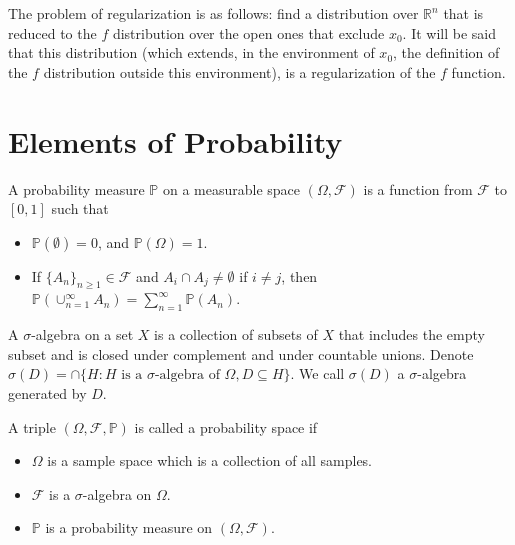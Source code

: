 	The problem of regularization is as follows: find a distribution over $\mathbb{R}^n$ that is reduced to the $f$ distribution over the open ones that exclude $x_0$. It will be said that this distribution (which extends, in the environment of $x_0$, the definition of the $f$ distribution outside this environment), is a regularization of the $f$ function.
	
\chapter{Elements of Probability}
\label{Appendix_B}
	\begin{definition}
		A probability measure $\mathbb{P}$ on a measurable space $(\Omega, \mathcal{F})$ is a function from $\mathcal{F}$ to $[0, 1]$ such that
			\begin{itemize}
				\item
				$\mathbb{P} (\emptyset) = 0$, and $\mathbb{P} (\Omega) = 1$.
				\item 
				If $\{ A_n \}_{n \geq 1} \in \mathcal{F}$ and $A_i \cap A_j \neq \emptyset$ if $i \neq j$, then $\mathbb{P} (\cup^{\infty}_{n=1} A_n) = \sum^{\infty}_{n = 1} \mathbb{P} (A_n)$.
			\end{itemize}	
	\end{definition}
	
	\noindent A $\sigma$-algebra on a set $X$ is a collection of subsets of $X$ that includes the empty subset and is closed under complement and under countable unions. Denote $\sigma (D) = \cap \{ H : H \text{ is a } \sigma \text{-algebra of } \Omega, D \subseteq H \}$. We call $\sigma (D)$ a $\sigma$-algebra generated by $D$.
	
	\begin{definition}
		A triple  $(\Omega, \mathcal{F}, \mathbb{P})$ is called a probability space if
		\begin{itemize}
			\item
			$\Omega$ is a sample space which is a collection of all samples.
			\item 
			$\mathcal{F}$ is a $\sigma$-algebra on $\Omega$.
			\item
			$\mathbb{P}$ is a probability measure on $(\Omega, \mathcal{F})$. 
		\end{itemize}	
	\end{definition}

